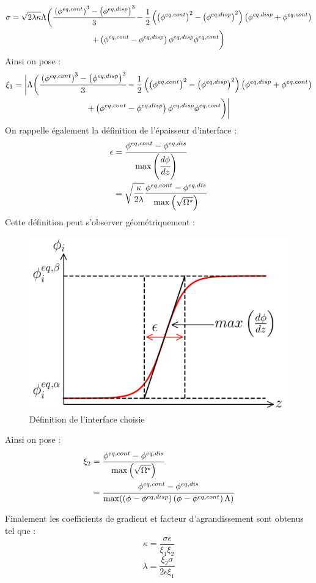 \begin{multline}
	\sigma=  \sqrt{2\lambda\kappa} \Lambda\biggl(\cfrac{\left(\phi^{eq,cont}\right)^3-\left(\phi^{eq,disp}\right)^3}{3} -\frac{1}{2} \left(\left(\phi^{eq,cont}\right)^2-\left(\phi^{eq,disp}\right)^2  \right)  \left(\phi^{eq,disp} +\phi^{eq,cont} \right) \\ +\left(\phi^{eq,cont}-\phi^{eq,disp}\right)\phi^{eq,disp}\phi^{eq,cont}\biggl)
\end{multline}
Ainsi on pose : 
\begin{multline}
	\xi_1 = \bigg|\Lambda\bigg(\cfrac{\left(\phi^{eq,cont}\right)^3-\left(\phi^{eq,disp}\right)^3}{3} -\frac{1}{2} \left(\left(\phi^{eq,cont}\right)^2-\left(\phi^{eq,disp}\right)^2  \right) \left(\phi^{eq,disp}  +\phi^{eq,cont} \right) \\ +\left(\phi^{eq,cont}-\phi^{eq,disp}\right)\phi^{eq,disp}\phi^{eq,cont}\bigg)\bigg|
\end{multline}
On rappelle également la définition de l'épaisseur d'interface :
\begin{align}
\epsilon&= \cfrac{\phi_{}^{eq,cont}-\phi_{}^{eq,dis}}{\max\left(\cfrac{d\phi_{}}{dz}\right)}
\\
&=\sqrt{\frac{\kappa}{2\lambda}}\frac{\phi^{eq,cont}-\phi^{eq,dis}}{\max\left(\sqrt{\Omega^{\star}}\right)}
\end{align}
Cette définition peut s'observer géométriquement :
\begin{figure}[H]
	\centering
	\includegraphics[width=0.3\linewidth]{figure/fig_interface}
	\caption{Définition de l'interface choisie}
	\label{fig:figinterface}
\end{figure}

Ainsi on pose :
\begin{align}
\xi_2&=\frac{\phi^{eq,cont}-\phi^{eq,dis}}{\max\left(\sqrt{\Omega^{\star}}\right)} \\
& = \cfrac{\phi^{eq,cont}-\phi^{eq,dis}}{\max({\left(\phi_{}-\phi_{}^{eq,disp}\right)\left(\phi_{}-\phi_{}^{eq,cont}\right)\Lambda})}
\end{align}

Finalement les coefficients de gradient et facteur d'agrandissement sont obtenus tel que : 
\begin{equation}
\kappa = \frac{\sigma \epsilon}{\xi_1 \xi_2}
\label{eq:kappa_potentiel_ternaire_}
\end{equation}
\begin{equation}
\lambda=\frac{\xi_2 \sigma}{2\epsilon\xi_1}
\label{eq:parametre_upscaling_potentiel_ternaire_}
\end{equation}